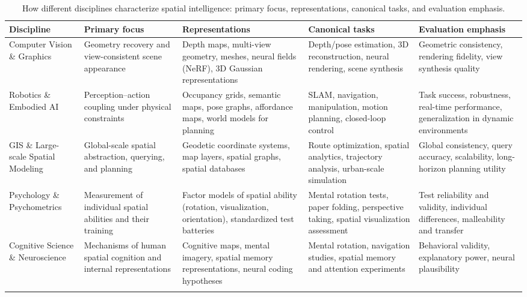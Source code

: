 \begin{table}[t]
\centering
\caption{How different disciplines characterize spatial intelligence: primary focus, representations, canonical tasks, and evaluation emphasis.}
\vspace{2mm}
\small
\setlength{\tabcolsep}{6pt}
\renewcommand{\arraystretch}{1.15}

\begin{tabular}{p{2.5cm} p{3cm} p{3cm} p{3cm} p{}}
\toprule
\textbf{Discipline} &
\textbf{Primary focus} &
\textbf{Representations} &
\textbf{Canonical tasks} &
\textbf{Evaluation emphasis} \\
\midrule

Computer Vision \& Graphics &
Geometry recovery and view-consistent scene appearance &
Depth maps, multi-view geometry, meshes, neural fields (NeRF), 3D Gaussian representations &
Depth/pose estimation, 3D reconstruction, neural rendering, scene synthesis &
Geometric consistency, rendering fidelity, view synthesis quality \\
\addlinespace[2pt]
\hline
\addlinespace[2pt]

Robotics \& Embodied AI &
Perception--action coupling under physical constraints &
Occupancy grids, semantic maps, pose graphs, affordance maps, world models for planning &
SLAM, navigation, manipulation, motion planning, closed-loop control &
Task success, robustness, real-time performance, generalization in dynamic environments \\
\addlinespace[2pt]
\hline
\addlinespace[2pt]

GIS \& Large-scale Spatial Modeling &
Global-scale spatial abstraction, querying, and planning &
Geodetic coordinate systems, map layers, spatial graphs, spatial databases &
Route optimization, spatial analytics, trajectory analysis, urban-scale simulation &
Global consistency, query accuracy, scalability, long-horizon planning utility \\
\addlinespace[2pt]
\hline
\addlinespace[2pt]

Psychology \& Psychometrics &
Measurement of individual spatial abilities and their training &
Factor models of spatial ability (rotation, visualization, orientation), standardized test batteries &
Mental rotation tests, paper folding, perspective taking, spatial visualization assessment &
Test reliability and validity, individual differences, malleability and transfer \\
\addlinespace[2pt]
\hline
\addlinespace[2pt]

Cognitive Science \& Neuroscience &
Mechanisms of human spatial cognition and internal representations &
Cognitive maps, mental imagery, spatial memory representations, neural coding hypotheses &
Mental rotation, navigation studies, spatial memory and attention experiments &
Behavioral validity, explanatory power, neural plausibility \\
\addlinespace[2pt]
\hline
\addlinespace[2pt]


\end{tabular}
\end{table}
